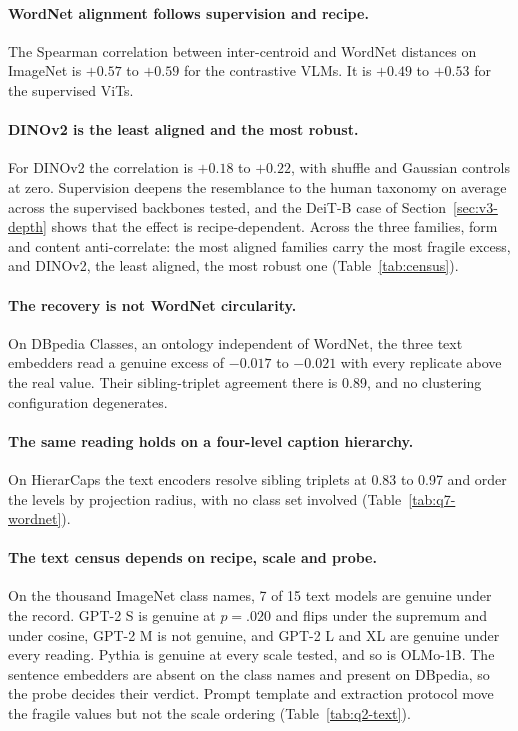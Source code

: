 \documentclass{article}
\theoremstyle{definition}
\theoremstyle{plain}
\theoremstyle{remark}
\begin{document}
\paragraph{WordNet alignment follows supervision and recipe.} The Spearman correlation between inter-centroid and WordNet distances on ImageNet is $+0.57$ to $+0.59$ for the contrastive VLMs. It is $+0.49$ to $+0.53$ for the supervised ViTs. %

\paragraph{DINOv2 is the least aligned and the most robust.} For DINOv2 the correlation is $+0.18$ to $+0.22$, with shuffle and Gaussian controls at zero. Supervision deepens the resemblance to the human taxonomy on average across the supervised backbones tested, and the DeiT-B case of Section~\ref{sec:v3-depth} shows that the effect is recipe-dependent. Across the three families, form and content anti-correlate: the most aligned families carry the most fragile excess, and DINOv2, the least aligned, the most robust one (Table~\ref{tab:census}). %

\paragraph{The recovery is not WordNet circularity.} On DBpedia Classes, an ontology independent of WordNet, the three text embedders read a genuine excess of $-0.017$ to $-0.021$ with every replicate above the real value. Their sibling-triplet agreement there is 0.89, and no clustering configuration degenerates. %

\paragraph{The same reading holds on a four-level caption hierarchy.} On HierarCaps the text encoders resolve sibling triplets at 0.83 to 0.97 and order the levels by projection radius, with no class set involved (Table~\ref{tab:q7-wordnet}). %

\paragraph{The text census depends on recipe, scale and probe.} On the thousand ImageNet class names, 7 of 15 text models are genuine under the record. GPT-2 S is genuine at $p=.020$ and flips under the supremum and under cosine, GPT-2 M is not genuine, and GPT-2 L and XL are genuine under every reading. Pythia is genuine at every scale tested, and so is OLMo-1B. The sentence embedders are absent on the class names and present on DBpedia, so the probe decides their verdict. Prompt template and extraction protocol move the fragile values but not the scale ordering (Table~\ref{tab:q2-text}). %
\end{document}
